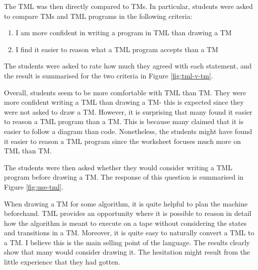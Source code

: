The TML was then directly compared to TMs. In particular, students were asked to compare TMs and TML programs in the following criteria:
\begin{enumerate}
    \item I am more confident in writing a program in TML than drawing a TM
    \item I find it easier to reason what a TML program accepts than a TM
\end{enumerate}
The students were asked to rate how much they agreed with each statement, and the result is summarised for the two criteria in Figure \ref{fig:tml-v-tm}. 

Overall, students seem to be more comfortable with TML than TM. They were more confident writing a TML than drawing a TM- this is expected since they were not asked to draw a TM. However, it is surprising that many found it easier to reason a TML program than a TM. This is because many claimed that it is easier to follow a diagram than code. Nonetheless, the students might have found it easier to reason a TML program since the worksheet focuses much more on TML than TM.


The students were then asked whether they would consider writing a TML program before drawing a TM. The response of this question is summarised in Figure \ref{fig:use-tml}. 

When drawing a TM for some algorithm, it is quite helpful to plan the machine beforehand. TML provides an opportunity where it is possible to reason in detail how the algorithm is meant to execute on a tape without considering the states and transitions in a TM. Moreover, it is quite easy to naturally convert a TML to a TM. I believe this is the main selling point of the language. The results clearly show that many would consider drawing it. The hesitation might result from the little experience that they had gotten.


